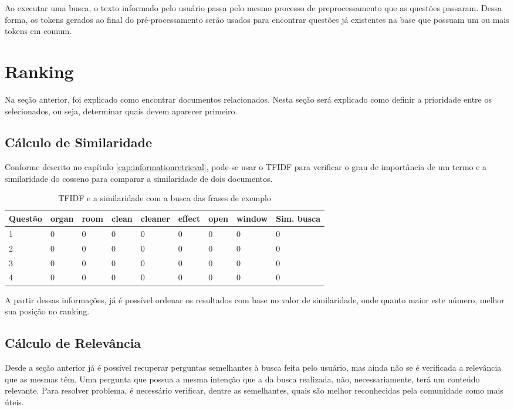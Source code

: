 Ao executar uma busca, o texto informado pelo usuário passa pelo mesmo processo de preprocessamento que as questões passaram. Dessa forma, os tokens gerados ao final do pré-processamento serão usados para encontrar questões já existentes na base que possuam um ou mais tokens em comum. 

\section{Ranking}
Na seção anterior, foi explicado como encontrar documentos relacionados. Nesta seção será explicado como definir a prioridade entre os selecionados, ou seja, determinar quais devem aparecer primeiro.

\subsection{Cálculo de Similaridade}
Conforme descrito no capítulo \ref{cap:informationretrieval}, pode-se usar o \ac{TFIDF} para verificar o grau de importância de um termo e a similaridade do cosseno para comparar a similaridade de dois documentos.

\begin{table}[htb]
	\centering
    \def\arraystretch{1.2}
    \begin{tabular}{|l|l|l|l|l|l|l|l|l|}
        \hline
        Questão & organ & room & clean & cleaner & effect & open & window & \textbf{Sim. busca}\\ \hline
        1 & 0 & 0 & 0 & 0 & 0 & 0 & 0 & 0 \\ \hline
        2 & 0 & 0 & 0 & 0 & 0 & 0 & 0 & 0 \\ \hline
        3 & 0 & 0 & 0 & 0 & 0 & 0 & 0 & 0 \\ \hline
        4 & 0 & 0 & 0 & 0 & 0 & 0 & 0 & 0 \\ \hline
    \end{tabular}
	\caption{TFIDF e a similaridade com a busca das frases de exemplo}
    \label{tab:tfidf}
\end{table}

A partir dessas informações, já é possível ordenar os resultados com base no valor de similaridade, onde quanto maior este número, melhor sua posição no ranking. 


\subsection{Cálculo de Relevância}
Desde a seção anterior já é possível recuperar perguntas semelhantes à busca feita pelo usuário, mas ainda não se é verificada a relevância que as mesmas têm. Uma pergunta que possua a mesma intenção que a da busca realizada, não, necessariamente, terá um conteúdo relevante. Para resolver problema, é necessário verificar, dentre as semelhantes, quais são melhor reconhecidas pela comunidade como mais úteis.

